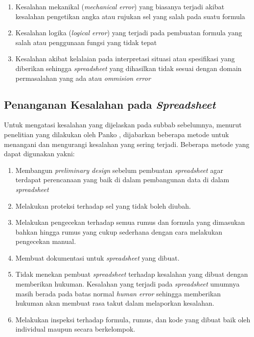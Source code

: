     \begin{enumerate}
        \item Kesalahan mekanikal (\textit{mechanical error}) yang biasanya terjadi akibat kesalahan pengetikan angka atau rujukan sel yang salah pada suatu formula
        \item Kesalahan logika (\textit{logical error}) yang terjadi pada pembuatan formula yang salah atau penggunaan fungsi yang tidak tepat
        \item Kesalahan akibat kelalaian pada interpretasi situasi atau spesifikasi yang diberikan sehingga \textit{spreadsheet} yang dihasilkan tidak sesuai dengan domain permasalahan yang ada atau \textit{ommision error} \citep{Powell2009}
    \end{enumerate}

\subsection{Penanganan Kesalahan pada \textit{Spreadsheet}} \label{PenangananKesalahan}
Untuk mengatasi kesalahan yang dijelaskan pada subbab sebelumnya, menurut penelitian yang dilakukan oleh Panko \citep{Panko1998}, dijabarkan beberapa metode untuk menangani dan mengurangi kesalahan yang sering terjadi. Beberapa metode yang dapat digunakan yakni:

    \begin{enumerate}
        \item Membangun \textit{preliminary design} sebelum pembuatan \textit{spreadsheet} agar terdapat perencanaan yang baik di dalam pembangunan data di dalam \textit{spreadsheet}
        \item Melakukan proteksi terhadap sel yang tidak boleh diubah.
        \item Melakukan pengecekan terhadap semua rumus dan formula yang dimasukan bahkan hingga rumus yang cukup sederhana dengan cara melakukan pengecekan manual.
        \item Membuat dokumentasi untuk \textit{spreadsheet} yang dibuat.
        \item Tidak menekan pembuat \textit{spreadsheet} terhadap kesalahan yang dibuat dengan memberikan hukuman. Kesalahan yang terjadi pada \textit{spreadsheet} umumnya masih berada pada batas normal \textit{human error} sehingga memberikan hukuman akan membuat rasa takut dalam melaporkan kesalahan.
        \item Melakukan inspeksi terhadap formula, rumus, dan kode yang dibuat baik oleh individual maupun secara berkelompok.
    \end{enumerate}

